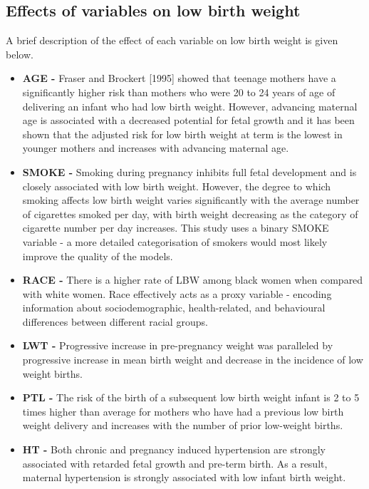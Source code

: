 \subsection{Effects of variables on low birth weight}
A brief description of the effect of each variable on low birth weight is given below.
\begin{itemize}
    \item \textbf{AGE -} Fraser and Brockert [1995] showed that teenage mothers have a significantly higher risk than mothers who were 20 to 24 years of age of delivering an infant who had low birth weight.\cite{AgeYoung} However, advancing maternal age is associated with a decreased potential for fetal growth and it has been shown that the adjusted risk for low birth weight at term is the lowest in younger mothers and increases with advancing maternal age.\cite{MaternalAge}
    
    \item \textbf{SMOKE -}
    Smoking during pregnancy inhibits full fetal development and is closely associated with low birth weight.\cite{SmokeLBW} However, the degree to which smoking affects low birth weight varies significantly with the average number of cigarettes smoked per day, with birth weight decreasing as the category of cigarette number per day increases.\cite{SmokeReduction} This study uses a binary SMOKE variable - a more detailed categorisation of smokers would most likely improve the quality of the models.
    
    \item \textbf{RACE -}
    There is a higher rate of LBW among black women when compared with white women.\cite{RaceDifference} Race effectively acts as a proxy variable - encoding information about sociodemographic, health-related, and behavioural differences between different racial groups.\cite{RaceLBW}
    
    \item \textbf{LWT -}
    Progressive increase in pre-pregnancy weight was paralleled by progressive increase in mean birth weight and decrease in the incidence of low weight births.\cite{Weight}
    
    \item \textbf{PTL -}
    The risk of the birth of a subsequent low birth weight infant is 2 to 5 times higher than average for mothers who have had a previous low birth weight delivery and increases with the number of prior low-weight births.\cite{bakketeig1979tendency}
    
    \item \textbf{HT -}
    Both chronic and pregnancy induced hypertension are strongly associated with retarded fetal growth and pre-term birth. As a result, maternal hypertension is strongly associated with low infant birth weight. \cite{InducedHT}\cite{HTRace}
    

\end{itemize}
